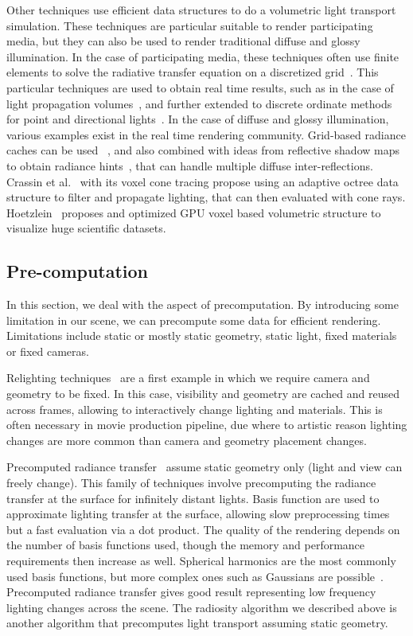 Other techniques use efficient data structures to do a volumetric light transport simulation. These techniques are particular suitable to render participating media, but they can also be used to render traditional diffuse and glossy illumination. In the case of participating media, these techniques often use finite elements to solve the radiative transfer equation on a discretized grid~\cite{Fattal2009}. This particular techniques are used to obtain real time results, such as in the case of light propagation volumes~\cite{Kaplanyan2009,Borlum2011}, and further extended to discrete ordinate methods for point and directional lights~\cite{Elek2014}. In the case of diffuse and glossy illumination, various examples exist in the real time rendering community. Grid-based radiance caches can be used ~\cite{Nijasure2005}, and also combined with ideas from reflective shadow maps to obtain radiance hints~\cite{Papaioannou2011, Vardis2014}, that can handle multiple diffuse inter-reflections.  Crassin et al.~\cite{Crassin2011} with its voxel cone tracing propose using an adaptive octree data structure to filter and propagate lighting, that can then evaluated with cone rays. Hoetzlein~\cite{Hoetzlein2016} proposes and optimized GPU voxel based volumetric structure to visualize huge scientific datasets. 

\subsection{Pre-computation}
In this section, we deal with the aspect of precomputation. By introducing some limitation in our scene, we can precompute some data for efficient rendering. Limitations include static or mostly static geometry, static light, fixed materials or fixed cameras. 

Relighting techniques~\cite{Nimeroff94, Pellacini2005, Hasan2006} are a first example in which we require camera and geometry to be fixed. In this case, visibility and geometry are cached and reused across frames, allowing to interactively change lighting and materials. This is often necessary in movie production pipeline, due where to artistic reason lighting changes are more common than camera and geometry placement changes.

Precomputed radiance transfer~\cite{Sloan2002} assume static geometry only (light and view can freely change). This family of techniques involve precomputing the radiance transfer at the surface for infinitely distant lights. Basis function are used to approximate lighting transfer at the surface, allowing slow preprocessing times but a fast evaluation via a dot product. The quality of the rendering depends on the number of basis functions used, though the memory and performance requirements then increase as well. Spherical harmonics are the most commonly used basis functions, but more complex ones such as Gaussians are possible~\cite{Green2006}. Precomputed radiance transfer gives good result representing low frequency lighting changes across the scene. The radiosity algorithm we described above is another algorithm that precomputes light transport assuming static geometry.

